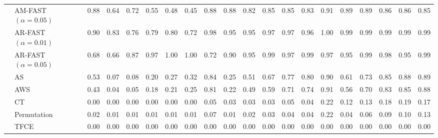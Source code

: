 \begin{table}[h]
{\begin{tabular}{|c|l|cccccc|cccccc|cccccc|}
        & AM-FAST $(\alpha=0.05)$ & 0.88 & 0.64 & 0.72 & 0.55 & 0.48 & 0.45 & 0.88 & 0.88 & 0.82 & 0.85 & 0.85 & 0.83 & 0.91 & 0.89 & 0.89 & 0.86 & 0.86 & 0.85 \\ 
        & AR-FAST $(\alpha=0.01)$ & 0.90 & 0.83 & 0.76 & 0.79 & 0.80 & 0.72 & 0.98 & 0.95 & 0.95 & 0.97 & 0.97 & 0.96 & 1.00 & 0.99 & 0.99 & 0.99 & 0.99 & 0.99 \\ 
         & AR-FAST $(\alpha=0.05)$ & 0.68 & 0.66 & 0.87 & 0.97 & 1.00 & 1.00 & 0.72 & 0.90 & 0.95 & 0.99 & 0.97 & 0.99 & 0.97 & 0.95 & 0.99 & 0.98 & 0.95 & 0.99 \\ 
&  AS & 0.53 & 0.07 & 0.08 & 0.20 & 0.27 & 0.32 & 0.84 & 0.25 & 0.51 & 0.67 & 0.77 & 0.80 & 0.90 & 0.61 & 0.73 & 0.85 & 0.88 & 0.89 \\ 
&  AWS & 0.43 & 0.04 & 0.05 & 0.18 & 0.21 & 0.25 & 0.81 & 0.22 & 0.49 & 0.59 & 0.71 & 0.74 & 0.91 & 0.56 & 0.70 & 0.83 & 0.85 & 0.88 \\ 
&  CT & 0.00 & 0.00 & 0.00 & 0.00 & 0.00 & 0.00 & 0.05 & 0.03 & 0.03 & 0.03 & 0.05 & 0.04 & 0.22 & 0.12 & 0.13 & 0.18 & 0.19 & 0.17 \\ 
 &  Permutation & 0.02 & 0.01 & 0.01 & 0.01 & 0.01 & 0.01 & 0.07 & 0.01 & 0.02 & 0.03 & 0.04 & 0.04 & 0.22 & 0.04 & 0.06 & 0.09 & 0.10 & 0.13 \\ 
&  TFCE & 0.00 & 0.00 & 0.00 & 0.00 & 0.00 & 0.00 & 0.00 & 0.00 & 0.00 & 0.00 & 0.00 & 0.00 & 0.00 & 0.00 & 0.00 & 0.00 & 0.00 & 0.00 \\ 
   \hline
      \end{tabular}
    }
  \end{table}

